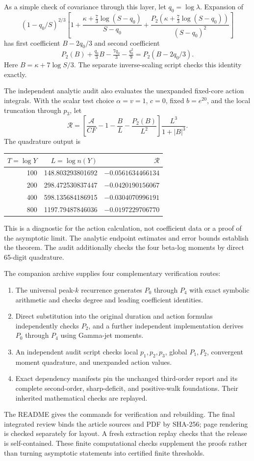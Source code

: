 \documentclass[11pt,letterpaper]{article}
\numberwithin{equation}{section}
\theoremstyle{remark}\newtheorem{remark}[theorem]{Remark}
\newcommand{\A}{\mathcal A}
\begin{document}
As a simple check of covariance through this layer, let
$q_0=\log\lambda$. Expansion of
\[
 (1-q_0/S)^{2/3}
 \left[1+\frac{\kappa+\frac73\log(S-q_0)}{S-q_0}
 +\frac{P_2(\kappa+\frac73\log(S-q_0))}{(S-q_0)^2}\right]
\]
has first coefficient $B-2q_0/3$ and second coefficient
\[
 P_2(B)+\tfrac{q_0}3B-\tfrac{7q_0}3-\tfrac{q_0^2}9
 =P_2(B-2q_0/3).
\]
Here $B=\kappa+7\log S/3$. The separate inverse-scaling script
checks this identity exactly.

The independent analytic audit also evaluates the unexpanded
fixed-core action integrals. With the scalar test choice
$\alpha=v=1$, $c=0$, fixed $b=e^{20}$, and the local truncation
through $p_3$, let
\[
 \mathcal R=\left[\frac{\A}{CF}-1-\frac BL-
 \frac{P_2(B)}{L^2}\right]\frac{L^3}{1+|B|^3}.
\]
The quadrature output is
\begin{center}
\begin{tabular}{rrr}
\toprule
$T=\log Y$&$L=\log n(Y)$&$\mathcal R$\\
\midrule
100&148.803293801692&$-0.0561634466134$\\
200&298.472530837447&$-0.0420190156067$\\
400&598.135684186915&$-0.0304070996191$\\
800&1197.79487846036&$-0.0197229706770$\\
\bottomrule
\end{tabular}
\end{center}
This is a diagnostic for the action calculation, not coefficient data
or a proof of the asymptotic limit. The analytic endpoint estimates
and error bounds establish the theorem. The audit additionally
checks the four beta-log moments by direct 65-digit quadrature.

The companion archive supplies four complementary verification
routes:
\begin{enumerate}
\item The universal peak-$k$ recurrence generates $P_0$ through $P_4$
with exact symbolic arithmetic and checks degree and leading
coefficient identities.
\item Direct substitution into the original duration and action
formulas independently checks $P_2$, and a further independent
implementation derives $P_0$ through $P_4$ using Gamma-jet moments.
\item An independent audit script checks local $p_1,p_2,p_3$, global
$P_1,P_2$, convergent moment quadrature, and unexpanded action values.
\item Exact dependency manifests pin the unchanged third-order report
and its complete second-order, sharp-deficit, and positive-walk
foundations. Their inherited mathematical checks are replayed.
\end{enumerate}
The README gives the commands for verification and rebuilding.
The final integrated review binds the article sources and PDF by
SHA-256; page rendering is checked separately for layout. A fresh
extraction replay checks that the release is self-contained. These
finite computational checks supplement the proofs rather than
turning asymptotic statements into certified finite thresholds.
\end{document}
